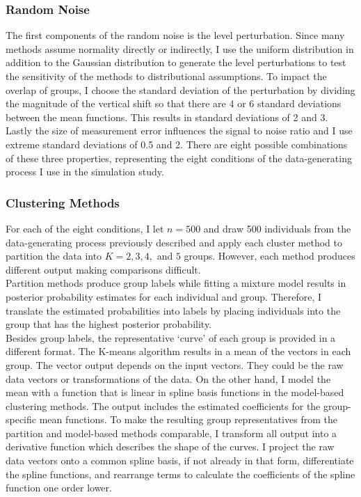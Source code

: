 \documentclass[12pt]{article}
\begin{document}
\subsubsection{Random Noise}
The first components of the random noise is the level perturbation. Since many methods assume normality directly or indirectly, I use the uniform distribution in addition to the Gaussian distribution to generate the level perturbations to test the sensitivity of the methods to distributional assumptions. To impact the overlap of groups, I choose the standard deviation of the perturbation by dividing the magnitude of the vertical shift so that there are 4 or 6 standard deviations between the mean functions. This results in standard deviations of 2 and 3. Lastly the size of measurement error influences the signal to noise ratio and I use extreme standard deviations of 0.5 and 2. There are eight possible combinations of these three properties, representing the eight conditions of the data-generating process I use in the simulation study. 
\subsubsection{Clustering Methods}
For each of the eight conditions, I let $n=500$ and draw 500 individuals from the data-generating process previously described and apply each cluster method to partition the data into $K=2,3,4,$ and $5$ groups. However, each method produces different output making comparisons difficult. \\

Partition methods produce group labels while fitting a mixture model results in posterior probability estimates for each individual and group. Therefore, I translate the estimated probabilities into labels by placing individuals into the group that has the highest posterior probability.\\

Besides group labels, the representative `curve' of each group is provided in a different format. The K-means algorithm results in a mean of the vectors in each group. The vector output depends on the input vectors. They could be the raw data vectors or transformations of the data. On the other hand, I model the mean with a function that is linear in spline basis functions in the model-based clustering methods. The output includes the estimated coefficients for the group-specific mean functions. To make the resulting group representatives from the partition and model-based methods comparable, I transform all output into a derivative function which describes the shape of the curves. I project the raw data vectors onto a common spline basis, if not already in that form, differentiate the spline functions, and rearrange terms to calculate the coefficients of the spline function one order lower. \\
\end{document}
